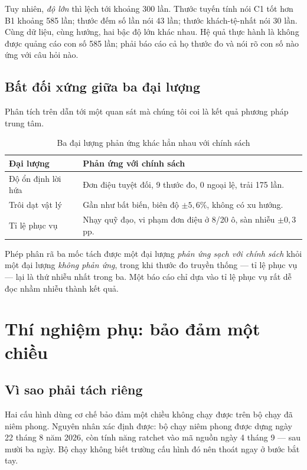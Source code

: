 Tuy nhiên, \emph{độ lớn} thì lệch tới khoảng 300 lần. Thước tuyến tính nói C1 tốt hơn B1 khoảng
585 lần; thước đếm số lần nói 43 lần; thước khách-tệ-nhất nói 30 lần. Cùng dữ liệu, cùng hướng,
hai bậc độ lớn khác nhau. Hệ quả thực hành là không được quảng cáo con số 585 lần; phải báo cáo
cả họ thước đo và nói rõ con số nào ứng với câu hỏi nào.

\subsection{Bất đối xứng giữa ba đại lượng}

Phân tích trên dẫn tới một quan sát mà chúng tôi coi là kết quả phương pháp trung tâm.

\begin{table}[htbp]
\centering
\caption{Ba đại lượng phản ứng khác hẳn nhau với chính sách}
\label{bang:batdoixung}
\small
\begin{tabular}{@{}lp{9.4cm}@{}}
\toprule
\textbf{Đại lượng} & \textbf{Phản ứng với chính sách}\\
\midrule
Độ ổn định lời hứa & Đơn điệu tuyệt đối, 9 thước đo, 0 ngoại lệ, trải 175 lần.\\
Trôi dạt vật lý & Gần như bất biến, biên độ $\pm 5{,}6\%$, không có xu hướng.\\
Tỉ lệ phục vụ & Nhạy quỹ đạo, vi phạm đơn điệu ở 8/20 ô, sàn nhiễu $\pm 0{,}3$ pp.\\
\bottomrule
\end{tabular}
\end{table}

Phép phân rã ba mốc tách được một đại lượng \emph{phản ứng sạch với chính sách} khỏi một đại
lượng \emph{không phản ứng}, trong khi thước đo truyền thống --- tỉ lệ phục vụ --- lại là thứ
nhiễu nhất trong ba. Một báo cáo chỉ dựa vào tỉ lệ phục vụ rất dễ đọc nhầm nhiễu thành kết quả.

\section{Thí nghiệm phụ: bảo đảm một chiều}
\label{muc:ratchet}

\subsection{Vì sao phải tách riêng}

Hai cấu hình dùng cơ chế bảo đảm một chiều không chạy được trên bộ chạy đã niêm phong. Nguyên
nhân xác định được: bộ chạy niêm phong được dựng ngày 22 tháng 8 năm 2026, còn tính năng ratchet
vào mã nguồn ngày 4 tháng 9 --- sau mười ba ngày. Bộ chạy không biết trường cấu hình đó nên
thoát ngay ở bước bắt tay.

